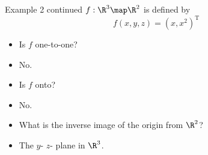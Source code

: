 \documentclass{beamer}
\begin{document}

\begin{frame}{Example 2 continued}
$f:\R^3\map\R^2$ is defined by
$$f(x,y,z) = (x, x^2)^{\text{T}}$$
\begin{itemize}
\item Is $f$ one-to-one?
\item No.
\item Is $f$ onto?
\item No.
\item What is the inverse image of the origin from $\R^2$?
\item The $y$- $z$- plane in $\R^3$.
\end{itemize}
\end{frame}
\end{document}
